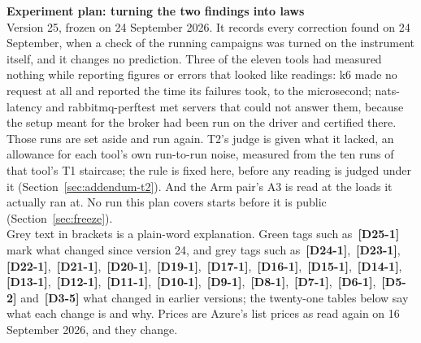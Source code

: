 \documentclass[11pt]{article}
\newcommand{\chg}[1]{\,{\color{chgcol}\bfseries\footnotesize[#1]}}
\newcommand{\chgold}[1]{\,{\color{oldcol}\bfseries\footnotesize[#1]}}
\begin{document}
{\LARGE\bfseries Experiment plan: turning the two findings into laws}\\[3pt]
{\large Version 25, frozen on 24 September 2026. It records every correction found on 24 September, when a check of the running campaigns was turned on the instrument itself, and it changes no prediction. Three of the eleven tools had measured nothing while reporting figures or errors that looked like readings: k6 made no request at all and reported the time its failures took, to the microsecond; nats-latency and rabbitmq-perftest met servers that could not answer them, because the setup meant for the broker had been run on the driver and certified there. Those runs are set aside and run again. T2's judge is given what it lacked, an allowance for each tool's own run-to-run noise, measured from the ten runs of that tool's T1 staircase; the rule is fixed here, before any reading is judged under it (Section~\ref{sec:addendum-t2}). And the Arm pair's A3 is read at the loads it actually ran at. No run this plan covers starts before it is public (Section~\ref{sec:freeze}).}\\[2pt]
{\color{soft}\small Grey text in brackets is a plain-word explanation. Green tags such as \chg{D25-1} mark what changed since version 24, and grey tags such as \chgold{D24-1}, \chgold{D23-1}, \chgold{D22-1}, \chgold{D21-1}, \chgold{D20-1}, \chgold{D19-1}, \chgold{D17-1}, \chgold{D16-1}, \chgold{D15-1}, \chgold{D14-1}, \chgold{D13-1}, \chgold{D12-1}, \chgold{D11-1}, \chgold{D10-1}, \chgold{D9-1}, \chgold{D8-1}, \chgold{D7-1}, \chgold{D6-1}, \chgold{D5-2} and \chgold{D3-5} what changed in earlier versions; the twenty-one tables below say what each change is and why. Prices are Azure's list prices as read again on 16 September 2026, and they change.}
\end{document}
